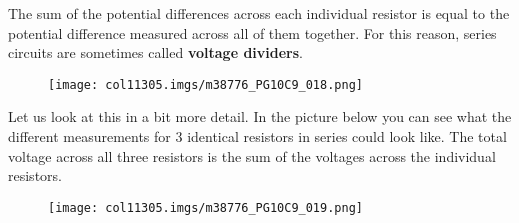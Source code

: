 The sum of the potential differences across each individual resistor is equal to the potential difference measured across all of them together. For this reason, series circuits are sometimes called \textbf{voltage dividers}.\par 
        \label{m38776*id64084}
    \setcounter{subfigure}{0}
	\begin{figure}[H] %
    \begin{center}
    \label{m38776*id64087!!!underscore!!!media}\label{m38776*id64087!!!underscore!!!printimage}\texttt{[image: col11305.imgs/m38776\_PG10C9\_018.png]} %
      \vspace{2pt}
    \vspace{.1in}
    \end{center}
 \end{figure}       
        \par 
        \label{m38776*id64094}Let us look at this in a bit more detail. In the picture below you can see what the different measurements for 3 identical resistors in series could look like. The total voltage across all three resistors is the sum of the voltages across the individual resistors. \par 
        \label{m38776*id64099}
    \setcounter{subfigure}{0}
	\begin{figure}[H] %
    \begin{center}
    \label{m38776*id64102!!!underscore!!!media}\label{m38776*id64102!!!underscore!!!printimage}\texttt{[image: col11305.imgs/m38776\_PG10C9\_019.png]} %
      \vspace{2pt}
    \vspace{.1in}
    \end{center}
 \end{figure}       
        \par 
\label{m38776*uid25342}
